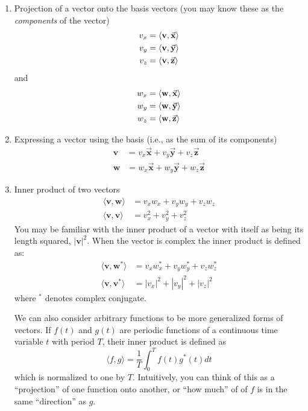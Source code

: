 \begin{enumerate}
\item Projection of a vector onto the basis vectors (you may
know these as the \emph{components} of the vector)
\begin{align}
v_x &= \langle\mathbf{v},\vec{\mathbf{x}}\rangle \notag\\
v_y &= \langle\mathbf{v},\vec{\mathbf{y}}\rangle \label{eq:basis-proj}\\
v_z &= \langle\mathbf{v},\vec{\mathbf{z}}\rangle \notag\\ 
\end{align}
and 
\begin{align}
w_x &= \langle\mathbf{w},\vec{\mathbf{x}}\rangle \notag\\
w_y &= \langle\mathbf{w},\vec{\mathbf{y}}\rangle \\
w_z &= \langle\mathbf{w},\vec{\mathbf{z}}\rangle \notag\\ 
\end{align}
\item Expressing a vector using the basis (i.e., as the sum of its
components)
\begin{align}
\mathbf{v} &= v_x\vec{\mathbf{x}} + v_y\vec{\mathbf{y}} +
v_z\vec{\mathbf{z}} \label{eq:vec-comps}\\ 
\mathbf{w} &= w_x\vec{\mathbf{x}} + w_y\vec{\mathbf{y}} +
w_z\vec{\mathbf{z}}
\end{align}
\item Inner product of two vectors
\begin{align}
\langle\mathbf{v}, \mathbf{w}\rangle &= v_xw_x +  v_yw_y + v_zw_z
 \label{eq:inner-product}\\
\langle\mathbf{v}, \mathbf{v}\rangle &= v_x^2 +  v_y^2 + v_z^2
\end{align}
You may be familiar with the inner product of a vector with itself as
being its length squared, $|\mathbf{v}|^2$.  When the vector is
complex the inner product is defined as:
\begin{align}
\langle\mathbf{v}, \mathbf{w^*}\rangle &= v_xw_x^* +  v_yw_y^* + v_zw_z^*
 \label{eq:complex-ip}\\
\langle\mathbf{v}, \mathbf{v^*}\rangle &= |v_x|^2 + |v_y|^2 + |v_z|^2
\end{align}
where $^*$ denotes complex conjugate. 

We can also consider arbitrary functions to be more generalized forms
of vectors. If $f(t)$ and $g(t)$ are periodic functions of a
continuous time variable $t$ with period $T$, their inner product is
defined as
\begin{equation}
\langle f, g\rangle = \frac{1}{T}\int_0^T f(t)g^*(t) dt \label{eq:func-ip}
\end{equation}
which is normalized to one by $T$. Intuitively, you can think of this as a ``projection'' of one function onto another, or ``how much'' of of $f$ is in the same ``direction'' as $g$.


\end{enumerate}
